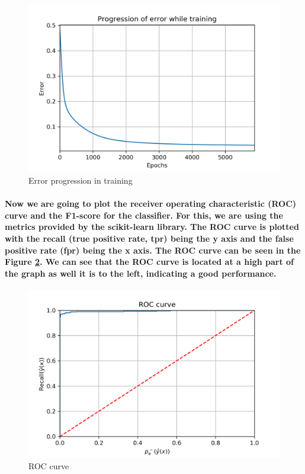 \documentclass[a4paper]{article}    %
\begin{document}
\begin{figure}[H]
    \centering
    \includegraphics[width=12cm]{error}
    \caption{Error progression in training}
    \label{fig:ex1-error}
\end{figure}

\paragraph{Now we are going to plot the receiver operating characteristic (ROC) curve and the F1-score for the classifier. For this, we are using the metrics provided by the scikit-learn library. The ROC curve is plotted with the recall (true positive rate, tpr) being the y axis and the false positive rate (fpr) being the x axis. The ROC curve can be seen in the Figure \ref{fig:ex1-roc}. We can see that the ROC curve is located at a high part of the graph as well it is to the left, indicating a good performance.}

\begin{figure}[H]
    \centering
    \includegraphics[width=12cm]{ROC}
    \caption{ROC curve}
    \label{fig:ex1-roc}
\end{figure}
\end{document}
